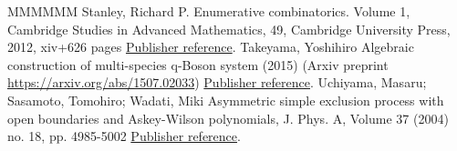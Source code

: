 \documentclass[11pt]{article}
\theoremstyle{definition}
\numberwithin{equation}{section}
\begin{document}
\begin{thebibliography}{MMMMMM}
 Stanley, Richard P. Enumerative combinatorics. Volume 1, Cambridge Studies in Advanced Mathematics, 49, Cambridge University Press, 2012, xiv+626 pages \href{https://alco.centre-mersenne.org/articles/10.5802/alco.248/#stanley-ec1}{Publisher reference}.
 Takeyama, Yoshihiro Algebraic construction of multi-species q-Boson system (2015) (Arxiv preprint \url{https://arxiv.org/abs/1507.02033}) \href{https://alco.centre-mersenne.org/articles/10.5802/alco.248/#takeyama-2015}{Publisher reference}.
 Uchiyama, Masaru; Sasamoto, Tomohiro; Wadati, Miki Asymmetric simple exclusion process with open boundaries and Askey-Wilson polynomials, J. Phys. A, Volume 37 (2004) no. 18, pp. 4985-5002 \href{https://alco.centre-mersenne.org/articles/10.5802/alco.248/#USW}{Publisher reference}.
\end{thebibliography}
\end{document}
